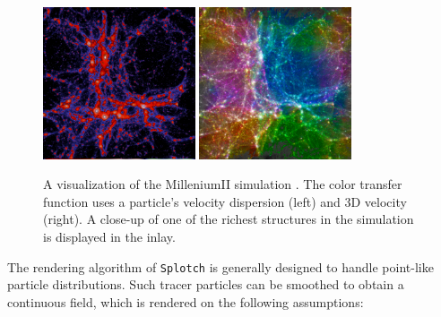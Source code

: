 \begin{figure}
\begin{center}
\includegraphics[width=0.40\textwidth]{millenium2_veldisp.pdf}
\includegraphics[width=0.40\textwidth]{millenium2_vel.pdf}
\end{center}
\caption{A visualization  of the MilleniumII simulation \citep{2009MNRAS.398.1150B}. The color transfer function uses a particle's velocity dispersion (left) and 3D velocity (right). A close-up of one of the richest structures in the simulation is displayed in the inlay.}\label{mil2}
\end{figure}

The rendering algorithm of {\tt Splotch} is generally designed to handle
point-like particle distributions. Such tracer particles can be smoothed
to obtain a continuous field, which is rendered
on the following assumptions:

